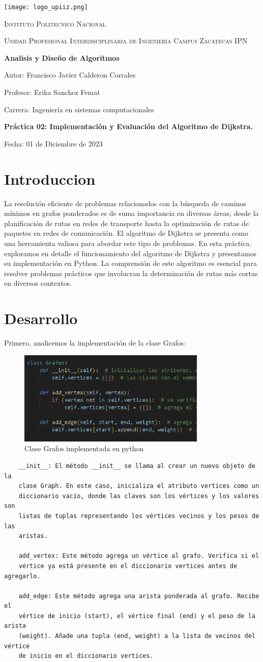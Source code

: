 \documentclass{article}
\renewcommand{\maketitle}{
\begin{titlepage}
    \centering
    \texttt{[image: logo\_upiiz.png]}\par\vspace{1cm}
    {\scshape\Large Instituto Politecnico Nacional \par}
    \vspace{0.5cm}
    {\scshape\large Unidad Profesional Interdisciplinaria de Ingeniería Campus Zacatecas IPN \par}
    \vspace{0.5cm}
    {\LARGE\bfseries Analisis y Diseño de Algoritmos\par}
    \vspace{0.5cm}
    {\Large Autor: Francisco Javier Calderon Corrales\par}
    \vspace{0.5cm}
    {\large Profesor: Erika Sanchez Femat \par}
    \vspace{0.5cm}
    {\Large Carrera: Ingeniería en sistemas computacionales\par}
    \vspace{0.5cm}
    {\Huge\bfseries Práctica 02: Implementación y Evaluación del Algoritmo de Dijkstra.\par}
    \vspace{1cm}
    \vfill
    {\large Fecha: 01 de Diciembre de 2023\par}
\end{titlepage}
}
\begin{document}
\maketitle
\section{Introduccion}
La resolución eficiente de problemas relacionados con la búsqueda de 
caminos mínimos en grafos ponderados es de suma importancia en diversas 
áreas, desde la planificación de rutas en redes de transporte hasta la 
optimización de rutas de paquetes en redes de comunicación. El algoritmo 
de Dijkstra se presenta como una herramienta valiosa para abordar este 
tipo de problemas. En esta práctica, exploramos en detalle el funcionamiento 
del algoritmo de Dijkstra y presentamos su implementación en Python. La 
comprensión de este algoritmo es esencial para resolver problemas prácticos 
que involucran la determinación de rutas más cortas en diversos contextos.
\section{Desarrollo}
Primero, analicemos la implementación de la clase Grafos:
\begin{figure}[H]
    \centering
    \includegraphics[width=0.8\textwidth]{figura_1_clase.PNG}
    \caption{Clase Grafos implementada en python}
    \label{figura 1}
\end{figure}
\begin{verbatim}
    __init__: El método __init__ se llama al crear un nuevo objeto de la 
    clase Graph. En este caso, inicializa el atributo vertices como un 
    diccionario vacío, donde las claves son los vértices y los valores son 
    listas de tuplas representando los vértices vecinos y los pesos de las 
    aristas.
    
    add_vertex: Este método agrega un vértice al grafo. Verifica si el 
    vértice ya está presente en el diccionario vertices antes de agregarlo.
    
    add_edge: Este método agrega una arista ponderada al grafo. Recibe el 
    vértice de inicio (start), el vértice final (end) y el peso de la arista 
    (weight). Añade una tupla (end, weight) a la lista de vecinos del vértice 
    de inicio en el diccionario vertices.
\end{verbatim}
\end{document}
